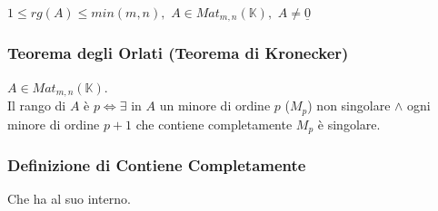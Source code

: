 \documentclass[a4paper, twoside, italian, 11pt]{book}
\newcommand{\K}{\mathbb{K}}
\begin{document}
\noindent
$1 \leq rg(A) \leq min(m,n),$ $A \in Mat_{m,n}(\K),$ $A \neq \underline{0}$


\subsubsection{Teorema degli Orlati (Teorema di Kronecker)}

$A \in Mat_{m,n}(\K)$.\\
Il rango di $A$ è $p \iff \exists$ in $A$ un minore di ordine $p$ ($M_p$) non singolare $\land$ ogni minore di ordine $p + 1$ che contiene completamente $M_p$ è singolare.

\subsubsection{Definizione di Contiene Completamente}
Che ha al suo interno.
\end{document}
